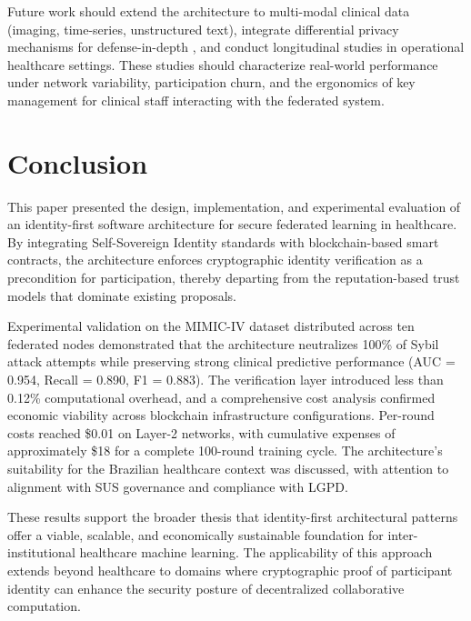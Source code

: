 \documentclass[english]{sbc2025}
\begin{document}
Future work should extend the architecture to multi-modal clinical data (imaging, time-series, unstructured text), integrate differential privacy mechanisms for defense-in-depth \citep{abadi2016deep}, and conduct longitudinal studies in operational healthcare settings. These studies should characterize real-world performance under network variability, participation churn, and the ergonomics of key management for clinical staff interacting with the federated system.


\section{Conclusion}
\label{sec:conclusion}

This paper presented the design, implementation, and experimental evaluation of an identity-first software architecture for secure federated learning in healthcare. By integrating Self-Sovereign Identity standards with blockchain-based smart contracts, the architecture enforces cryptographic identity verification as a precondition for participation, thereby departing from the reputation-based trust models that dominate existing proposals.

Experimental validation on the MIMIC-IV dataset distributed across ten federated nodes demonstrated that the architecture neutralizes 100\% of Sybil attack attempts while preserving strong clinical predictive performance (AUC = 0.954, Recall = 0.890, F1 = 0.883). The verification layer introduced less than 0.12\% computational overhead, and a comprehensive cost analysis confirmed economic viability across blockchain infrastructure configurations. Per-round costs reached \$0.01 on Layer-2 networks, with cumulative expenses of approximately \$18 for a complete 100-round training cycle. The architecture's suitability for the Brazilian healthcare context was discussed, with attention to alignment with SUS governance and compliance with LGPD.

These results support the broader thesis that identity-first architectural patterns offer a viable, scalable, and economically sustainable foundation for inter-institutional healthcare machine learning. The applicability of this approach extends beyond healthcare to domains where cryptographic proof of participant identity can enhance the security posture of decentralized collaborative computation.
\end{document}
